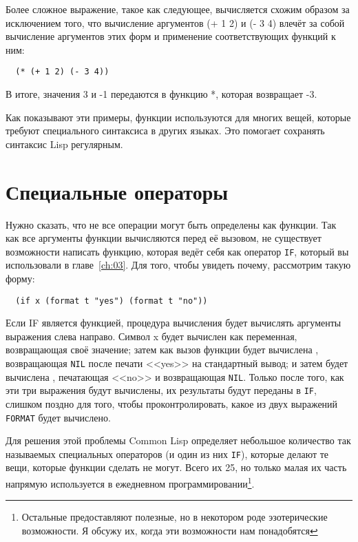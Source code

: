 Более сложное выражение, такое как следующее, вычисляется схожим образом за исключением
того, что вычисление аргументов (+ 1 2) и (- 3 4) влечёт за собой вычисление аргументов
этих форм и применение соответствующих функций к ним:

\begin{lstlisting}
  (* (+ 1 2) (- 3 4))
\end{lstlisting}

В итоге, значения 3 и -1 передаются в функцию *, которая возвращает -3.

Как показывают эти примеры, функции используются для многих вещей, которые требуют
специального синтаксиса в других языках. Это помогает сохранять синтаксис Lisp регулярным.

\section{Специальные операторы}

Нужно сказать, что не все операции могут быть определены как функции. Так как все
аргументы функции вычисляются перед её вызовом, не существует возможности написать
функцию, которая ведёт себя как оператор \lstinline{IF}, который вы использовали в
главе~\ref{ch:03}. Для того, чтобы увидеть почему, рассмотрим такую форму:

\begin{lstlisting}
  (if x (format t "yes") (format t "no"))
\end{lstlisting}

Если IF является функцией, процедура вычисления будет вычислять аргументы выражения слева
направо. Символ x будет вычислен как переменная, возвращающая своё значение; затем как
вызов функции будет вычислена , возвращающая \lstinline{NIL} после
печати <<yes>> на стандартный вывод; и затем будет вычислена , печатающая
<<no>> и возвращающая \lstinline{NIL}. Только после того, как эти три выражения будут
вычислены, их результаты будут переданы в \lstinline{IF}, слишком поздно для того, чтобы
проконтролировать, какое из двух выражений \lstinline{FORMAT} будет вычислено.

Для решения этой проблемы Common Lisp определяет небольшое количество так называемых
специальных операторов (и один из них \lstinline{IF}), которые делают те вещи, которые
функции сделать не могут. Всего их 25, но только малая их часть напрямую используется в
ежедневном программировании\footnote{Остальные предоставляют полезные, но в некотором роде
  эзотерические возможности. Я обсужу их, когда эти возможности нам понадобятся}.

